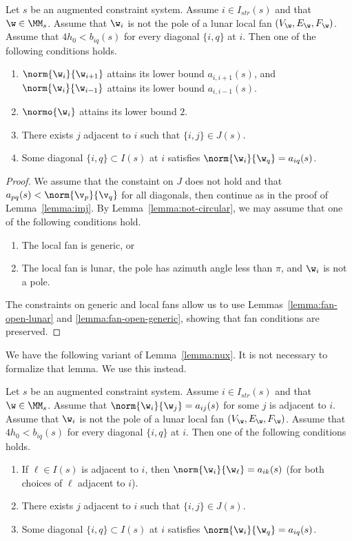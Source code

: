 \begin{lemma}\label{lemma:imj2}
Let $s$ be an augmented constraint system.  Assume $i\in I_{str}(s)$ and
that $\w\in \MM_s$.  
Assume  that $\w_i$ is not the pole of a lunar local fan $(V_\w,E_\w,F_\w)$.
Assume that $4h_0 < b_{iq}(s)$ for every diagonal $\{i,q\}$ at $i$.
Then one of the following conditions holds.
\begin{enumerate}
\item $\norm{\w_i}{\w_{i+1}}$ attains its lower bound $a_{i,i+1}(s)$, and
 $\norm{\w_i}{\w_{i-1}}$ attains its lower bound $a_{i,i-1}(s)$.
\item $\normo{\w_i}$ attains its lower bound $2$.
\item There exists $j$ adjacent to $i$ such that $\{i,j\}\in J(s)$.
\item Some diagonal $\{i,q\}\subset I(s)$ at $i$ satisfies
$\norm{\w_i}{\w_q}=a_{i q}(s)$.
\end{enumerate}
\end{lemma}

\begin{proof} We assume that the constaint on $J$ does not hold and
that $a_{p q}(s)<\norm{\v_p}{\v_q}$ for all diagonals, then continue as in the proof of
Lemma~\ref{lemma:imj}.
By Lemma~\ref{lemma:not-circular}, we may assume that one of the
following
conditions hold.
\begin{enumerate}
\item The local fan is generic, or
\item The local fan is lunar, the pole has azimuth
angle less than $\pi$, and $\w_i$ is not a pole.  
\end{enumerate}
The constraints on generic and local fans
allow us to use Lemmas~\ref{lemma:fan-open-lunar} and
\ref{lemma:fan-open-generic}, showing that fan conditions are preserved.
\end{proof}

We have the following variant of Lemma~\ref{lemma:nux}.
It is not necessary to formalize that lemma.  We use this instead.

\begin{lemma}\label{lemma:nux2}
Let $s$ be an augmented constraint system.  Assume $i\in I_{str}(s)$
and that $\w\in \MM_s$.   
Assume that $\norm{\w_i}{\w_j}=a_{ij}(s)$ for
some $j$ is adjacent to $i$.  
Assume  that $\w_i$ is not the pole of a lunar local fan $(V_\w,E_\w,F_\w)$.
Assume that $4h_0 < b_{iq}(s)$ for every diagonal $\{i,q\}$ at $i$.
Then
one of the following conditions holds.
\begin{enumerate}
\item If $\ell\in I(s)$ is adjacent to $i$, then $\norm{\w_i}{\w_\ell}=a_{ik}(s)$
(for both choices of $\ell$ adjacent to $i$).
\item There exists $j$ adjacent to $i$ such that $\{i,j\}\in J(s)$.
\item Some diagonal $\{i,q\}\subset I(s)$ at $i$ satisfies
$\norm{\w_i}{\w_q}=a_{i q}(s)$.
\end{enumerate}
\end{lemma}

